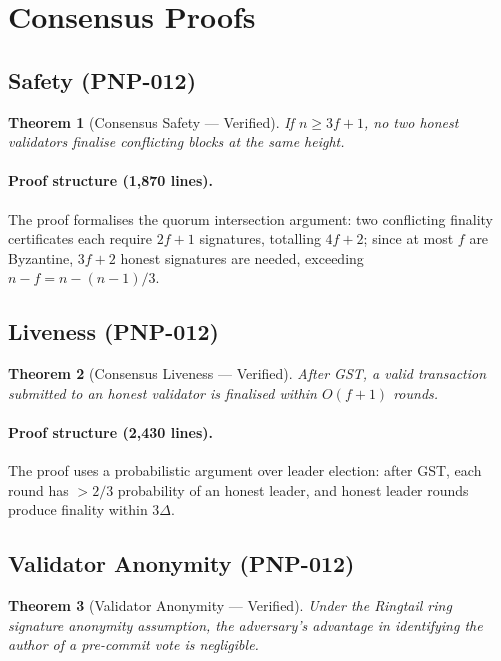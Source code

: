 \documentclass[11pt,a4paper]{article}
\newtheorem{theorem}{Theorem}[section]
\begin{document}
\section{Consensus Proofs}
\label{sec:consensus}

\subsection{Safety (PNP-012)}

\begin{theorem}[Consensus Safety --- Verified]
\label{thm:safety}
    If $n \geq 3f + 1$, no two honest validators finalise conflicting
    blocks at the same height.
\end{theorem}

\paragraph{Proof structure (1{,}870 lines).}
The proof formalises the quorum intersection argument: two conflicting
finality certificates each require $2f+1$ signatures, totalling
$4f+2$; since at most $f$ are Byzantine, $3f+2$ honest signatures
are needed, exceeding $n - f = n - (n-1)/3$.

\subsection{Liveness (PNP-012)}

\begin{theorem}[Consensus Liveness --- Verified]
\label{thm:liveness}
    After GST, a valid transaction submitted to an honest validator is
    finalised within $O(f+1)$ rounds.
\end{theorem}

\paragraph{Proof structure (2{,}430 lines).}
The proof uses a probabilistic argument over leader election: after GST,
each round has $> 2/3$ probability of an honest leader, and honest
leader rounds produce finality within $3\Delta$.

\subsection{Validator Anonymity (PNP-012)}

\begin{theorem}[Validator Anonymity --- Verified]
\label{thm:anon}
    Under the Ringtail ring signature anonymity assumption, the
    adversary's advantage in identifying the author of a pre-commit
    vote is negligible.
\end{theorem}
\end{document}
